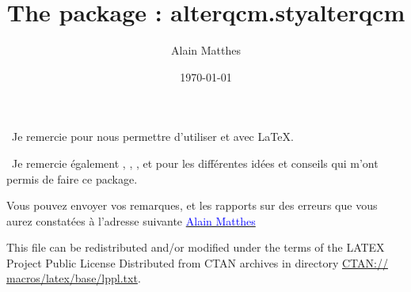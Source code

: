 \documentclass[DIV=15,
               fontsize=10,
               headinclude=false,
               index=totoc,
               footinclude=false,
               twoside,
               headings=small]{tkz-doc}
\title{The package : alterqcm.sty}
\author{Alain Matthes}
\gdef\nameofpack{alterqcm}
\begin{document}
\title{\nameofpack}
\date{\today}
\clearpage
\thispagestyle{empty}
\maketitle
\clearpage 
{}
\pagecolor{fondpaille}
\color{Maroon} 

\nameoffile{\nameofpack} 

\presentation

\vspace*{12pt}

\lefthand\ Je remercie   pour nous permettre d'utiliser  et  avec \LaTeX.

\vspace*{12pt}
\lefthand\ Je remercie également  ,  ,  ,  et   pour les différentes idées et conseils qui m'ont permis de faire ce package.

\vfill
Vous pouvez envoyer vos remarques, et les rapports sur des erreurs que vous aurez constatées
 à l'adresse suivante  \href{mailto:al.ma@mac.com}{\textcolor{blue}{Alain Matthes}}
 
 
This file can be redistributed and/or modified under the terms of the LATEX 
Project Public License Distributed from CTAN archives in directory \url{CTAN:// 
macros/latex/base/lppl.txt}. 

\clearpage\newpage
\setlength{\parskip}{1ex plus 0.5ex minus 0.2ex}  

\tableofcontents







  

\clearpage\newpage 
\makeatletter    
\printindex  
\end{document}
